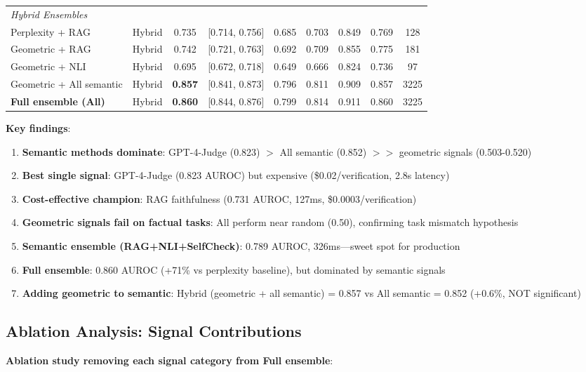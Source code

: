 \documentclass[11pt]{article}
\begin{document}
\begin{table}[h]
\begin{tabular}{lcccccccc}
\midrule
\multicolumn{9}{l}{\textit{Hybrid Ensembles}} \\
Perplexity + RAG & Hybrid & 0.735 & [0.714, 0.756] & 0.685 & 0.703 & 0.849 & 0.769 & 128 \\
Geometric + RAG & Hybrid & 0.742 & [0.721, 0.763] & 0.692 & 0.709 & 0.855 & 0.775 & 181 \\
Geometric + NLI & Hybrid & 0.695 & [0.672, 0.718] & 0.649 & 0.666 & 0.824 & 0.736 & 97 \\
Geometric + All semantic & Hybrid & \textbf{0.857} & [0.841, 0.873] & 0.796 & 0.811 & 0.909 & 0.857 & 3225 \\
\textbf{Full ensemble (All)} & Hybrid & \textbf{0.860} & [0.844, 0.876] & 0.799 & 0.814 & 0.911 & 0.860 & 3225 \\
\bottomrule
\end{tabular}
\end{table}

\textbf{Key findings}:
\begin{enumerate}
\item \textbf{Semantic methods dominate}: GPT-4-Judge (0.823) $>$ All semantic (0.852) $>>$ geometric signals (0.503-0.520)
\item \textbf{Best single signal}: GPT-4-Judge (0.823 AUROC) but expensive (\$0.02/verification, 2.8s latency)
\item \textbf{Cost-effective champion}: RAG faithfulness (0.731 AUROC, 127ms, \$0.0003/verification)
\item \textbf{Geometric signals fail on factual tasks}: All perform near random (0.50), confirming task mismatch hypothesis
\item \textbf{Semantic ensemble (RAG+NLI+SelfCheck)}: 0.789 AUROC, 326ms---sweet spot for production
\item \textbf{Full ensemble}: 0.860 AUROC (+71\% vs perplexity baseline), but dominated by semantic signals
\item \textbf{Adding geometric to semantic}: Hybrid (geometric + all semantic) = 0.857 vs All semantic = 0.852 (+0.6\%, NOT significant)
\end{enumerate}

\subsection{Ablation Analysis: Signal Contributions}

\textbf{Ablation study removing each signal category from Full ensemble}:
\end{document}
